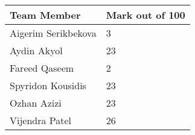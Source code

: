 \documentclass[11pt,a4paper]{report}
\begin{document}
\begin{center}
\begin{tabular}{| l | l |}
  \hline
  Team Member & Mark out of 100 \\
  \hline
  Aigerim Serikbekova & 3\\
  \hline
  Aydin Akyol & 23\\
  \hline
  Fareed Qaseem & 2\\
  \hline
  Spyridon Kousidis & 23\\
  \hline
  Ozhan Azizi & 23\\
  \hline
  Vijendra Patel & 26\\
  \hline
\end{tabular}
\end{center}


{}
\end{document}
